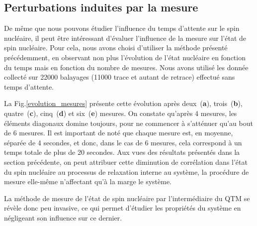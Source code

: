 \subsection{Perturbations induites par la mesure}
De m\^eme que nous pouvons étudier l'influence du temps d'attente sur le spin nucléaire, il peut \^etre intéressant d'évaluer l'influence de la mesure sur l'état de spin nucléaire. Pour cela, nous avons choisi d'utiliser la méthode présenté précédemment, en observant non plus l'évolution de l'état nucléaire en fonction du temps mais en fonction du nombre de mesures. Nous avons utilisé les donnée collecté sur 22000 balayages (11000 trace et autant de retrace) effectué sans temps d'attente.

La Fig.\ref{evolution_mesures} présente cette évolution après deux~(\textbf{a}), trois~(\textbf{b}), quatre~(\textbf{c}), cinq~(\textbf{d}) et six~(\textbf{e}) mesures. On constate qu'après 4 mesures, les éléments diagonaux domine toujours, pour ne commencer à s'atténuer qu'au bout de 6 mesures. Il est important de noté que chaque mesure est, en moyenne, séparée de 4 secondes, et donc, dans le cas de 6 mesures, cela correspond à un temps totale de plus de 20 secondes. Aux vues des résultats présentés dans la section précédente, on peut attribuer cette diminution de corrélation dans l'état du spin nucléaire au processus de relaxation interne au système, la procédure de mesure elle-même n'affectant qu'à la marge le système. 

La méthode de mesure de l'état de spin nucléaire par l'intermédiaire du QTM se révèle donc peu invasive, ce qui permet d'étudier les propriétés du système en négligeant son influence sur ce dernier.

